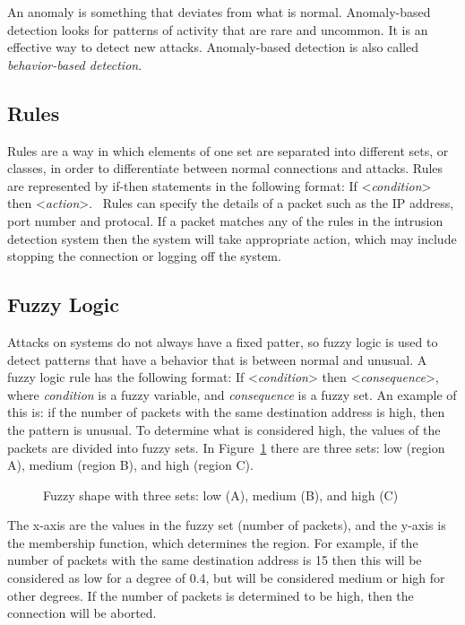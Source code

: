 \documentclass{sig-alternate}
\begin{document}
An anomaly is something that deviates from what is normal. Anomaly-based detection looks for patterns of activity that are rare and uncommon. It is an effective way to detect new attacks. Anomaly-based detection is also called \emph{behavior-based detection}.~\cite{DBLP:journals/corr/abs-1204-1336}




\subsection{Rules}
Rules are a way in which elements of one set are separated into different sets, or classes, in order to differentiate between normal connections and attacks. Rules are represented by if-then statements in the following format: If <\emph{condition}> then <\emph{action}>.~\cite{bapuji2012soft} Rules can specify the details of a packet such as the IP address, port number and protocal. If a packet matches any of the rules in the intrusion detection system then the system will take appropriate action, which may include stopping the connection or logging off the system.~\cite{DBLP:journals/corr/abs-1204-6416}




\subsection{Fuzzy Logic}
Attacks on systems do not always have a fixed patter, so fuzzy logic is used to detect patterns that have a behavior that is between normal and unusual. A fuzzy logic rule has the following format: If <\emph{condition}> then <\emph{consequence}>, where \emph{condition} is a fuzzy variable, and \emph{consequence} is a fuzzy set. An example of this is: if the number of packets with the same destination address is high, then the pattern is unusual. To determine what is considered high, the values of the packets are divided into fuzzy sets. In Figure~\ref{fig:triangleFigure} there are three sets: low (region A), medium (region B), and high (region C). 
\begin{figure}
\centering
{}
\caption{Fuzzy shape with three sets: low (A), medium (B), and high (C)}
\label{fig:triangleFigure}
\end{figure}
The x-axis are the values in the fuzzy set (number of packets), and the y-axis is the membership function, which determines the region. For example, if the number of packets with the same destination address is 15 then this will be considered as low for a degree of 0.4, but will be considered medium or high for other degrees. If the number of packets is determined to be high, then the connection will be aborted.~\cite{DBLP:journals/corr/abs-1204-6416}
\end{document}
